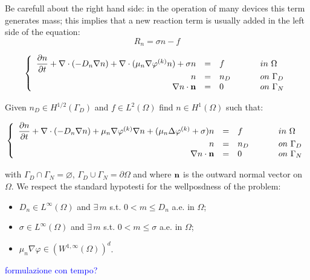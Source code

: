 Be carefull about the right hand side: in the operation of many devices this term generates mass; this implies that a new reaction term is usually added in the left side of the equation:
\begin{equation}
R_n = \sigma n - f
\end{equation}

\begin{equation}
\left\{
\begin{array}{rcll}
\dfrac{\partial n}{\partial t} + \nabla \cdot ( - D_n \nabla n ) + \nabla \cdot ( \mu_n \nabla \varphi^{(k)} n )  + \sigma n & = & f  & \psp{15} in \psp{2} \Omega \\
n & = &  n_D & \psp{15} on \psp{2} \Gamma_D \\
\nabla n \cdot \vect{n} & = & 0 & \psp{15} on \psp{2} \Gamma_N
\end{array}
\right.
\end{equation}

Given $n_D \in H^{1/2}(\Gamma_D)$ and $f \in L^2(\Omega)$ find $n \in H^1(\Omega)$ such that:

\begin{equation}
\left\{
\begin{array}{rcll}
\dfrac{\partial n}{\partial t} + \nabla \cdot ( - D_n \nabla n ) + \mu_n \nabla \varphi^{(k)} \nabla n  + (\mu_n \Delta \varphi^{(k)} + \sigma) n & = & f  & \psp{15} in \psp{2} \Omega \\
n & = &  n_D & \psp{15} on \psp{2} \Gamma_D \\
\nabla n \cdot \vect{n} & = & 0 & \psp{15} on \psp{2} \Gamma_N
\end{array}
\right.
\end{equation}

with $\Gamma_D\cap\Gamma_N=\varnothing$, $\Gamma_D\cup\Gamma_N=\partial \Omega$ and where $\mathbf{n}$ is the outward normal vector on $\Omega$.
We respect the standard hypotesti for the wellposdness of the problem:
\begin{itemize}
\item $D_n \in L^{\infty}(\Omega)$ and $\exists \, m$ s.t. $0<m\leq D_n$ a.e. in $\Omega$;
\item $\sigma \in L^{\infty}(\Omega)$ and $\exists \, m$ s.t. $0<m\leq \sigma$ a.e. in $\Omega$;
\item $\mu_n \nabla \varphi \in (W^{1,\infty}(\Omega))^d$.
\end{itemize}

\textcolor{blue}{formulazione con tempo?}


